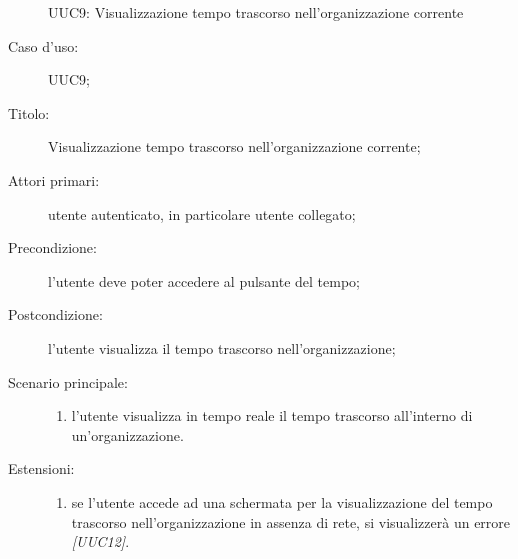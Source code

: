 \documentclass[../../../analisi-dei-requisiti.tex]{subfiles}
\begin{document}
\begin{figure}[H]
  \centering
  \caption{UUC9: Visualizzazione tempo trascorso nell'organizzazione corrente}%
  \label{fig:UUC9}
\end{figure}

\begin{description}
  \item[Caso d’uso:] UUC9;
  \item[Titolo:] Visualizzazione tempo trascorso nell'organizzazione corrente;
  \item[Attori primari:] utente autenticato, in particolare utente collegato;
  \item[Precondizione:] l'utente deve poter accedere al pulsante del tempo;
  \item[Postcondizione:] l'utente visualizza il tempo trascorso nell'organizzazione;
  \item[Scenario principale:]
        \begin{enumerate}
          \item l'utente visualizza in tempo reale il tempo trascorso all'interno di un'organizzazione.
        \end{enumerate}
  \item[Estensioni:]
        \begin{enumerate}
          \item se l'utente accede ad una schermata per la visualizzazione del tempo trascorso nell'organizzazione in assenza di rete, si visualizzerà un errore \emph{[UUC12]}.
        \end{enumerate}
\end{description}
\end{document}
